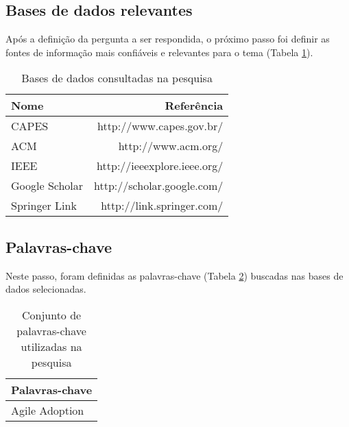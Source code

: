 		\subsection{Bases de dados relevantes}
			Após a definição da pergunta a ser respondida, o próximo passo foi definir as fontes de informação mais confiáveis e relevantes para o tema (Tabela \ref{tab:basesDeDados}).
			\begin{table}[H]
				\centering
				\begin{tabular}{| l | r |} \hline \textbf{Nome} & \textbf{Referência} \\ \hline
					CAPES & http://www.capes.gov.br/ \\ \hline
					ACM & http://www.acm.org/ \\ \hline
					IEEE & http://ieeexplore.ieee.org/ \\ \hline
					Google Scholar & http://scholar.google.com/ \\ \hline
					Springer Link & http://link.springer.com/ \\ \hline
				\end{tabular}
				\caption{Bases de dados consultadas na pesquisa}
				\label{tab:basesDeDados}
			\end{table}
		\subsection{Palavras-chave}
			Neste passo, foram definidas as palavras-chave (Tabela \ref{tab:palavrasChave}) buscadas nas bases de dados selecionadas.
			\begin{table}[H]
				\centering
				\begin{tabular}{| l |} \hline \textbf{Palavras-chave} \\ \hline
					Agile Adoption \\ \hline
				\end{tabular}
				\caption{Conjunto de palavras-chave utilizadas na pesquisa}
				\label{tab:palavrasChave}
			\end{table}

